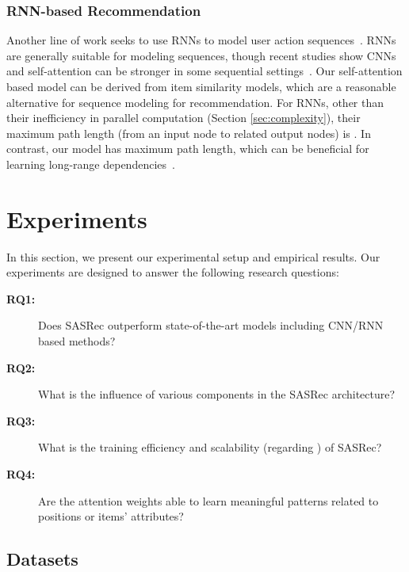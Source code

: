\documentclass[conference]{IEEEtran}
\newcommand{\xhdr}[1]{\subsubsection*{\bf #1}}
\begin{document}
\xhdr{RNN-based Recommendation} Another line of work seeks to use RNNs to model user action sequences~\cite{DBLP:journals/corr/HidasiKBT15,DBLP:journals/corr/HidasiK17,DBLP:conf/wsdm/WuABSJ17}. RNNs are generally suitable for modeling sequences, though recent studies show CNNs and self-attention can be stronger in some sequential settings~\cite{transform,DBLP:journals/corr/abs-1803-01271}. Our self-attention based model can be derived from item similarity models, which are a reasonable alternative for sequence modeling for recommendation. For RNNs, other than their inefficiency in parallel computation (Section \ref{sec:complexity}), 
their
maximum path length (from an input node to related output nodes) is . In contrast, our model has  maximum path length, 
which can be beneficial
for learning long-range dependencies~\cite{hochreiter2001gradient}. 

\section{Experiments}

In this section, we present 
our
experimental setup and empirical results. Our experiments are designed to answer the following research questions:
\begin{description}
\item[\textbf{RQ1:}] Does 
SASRec
outperform state-of-the-art models including CNN/RNN based methods?
\item[\textbf{RQ2:}] What 
is the influence of various
components in the SASRec architecture?
\item[\textbf{RQ3:}] What is the training efficiency and scalability (regarding ) of SASRec?
\item[\textbf{RQ4:}] Are the attention weights able to learn meaningful patterns related to positions or items' attributes?
\end{description}

\subsection{Datasets}
\end{document}
